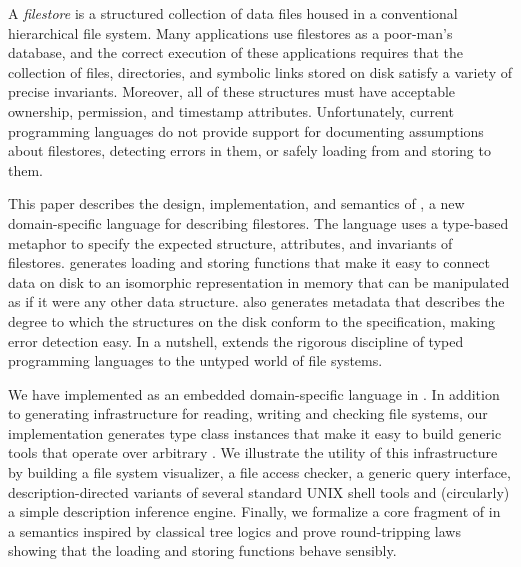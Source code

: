 A {\em filestore} is a structured collection of data files housed in a
conventional hierarchical file system. Many applications use filestores
as a poor-man's database, and the correct execution of these
applications requires that the collection of files, directories, and
symbolic links stored on disk satisfy a variety of precise
invariants. Moreover, all of these structures must have acceptable
ownership, permission, and timestamp attributes. Unfortunately,
current programming languages do not provide support for documenting
assumptions about filestores, detecting errors in them, or safely loading from
and storing to them.

This paper describes the design, implementation, and semantics of
\forest{}, a new domain-specific language for describing
filestores. The language uses a type-based metaphor to specify the
expected structure, attributes, and invariants of filestores.
\forest{} generates loading and storing functions that make it easy to
connect data on disk to an isomorphic representation in memory that
can be manipulated as if it were any other data structure.  \forest{}
also generates metadata that describes the degree to which the
structures on the disk conform to the specification, making error
detection easy. In a nutshell, \forest{} extends the
rigorous discipline of typed programming languages to the untyped 
world of file systems.

We have implemented \forest{} as an embedded domain-specific language
in \haskell{}. In addition to generating infrastructure for reading,
writing and checking file systems, our implementation generates 
type class instances that make it easy to build generic tools that
operate over arbitrary \filestores.  We illustrate the utility of
this infrastructure by building a file system visualizer, a file access
checker, a generic query interface, description-directed variants of 
several standard UNIX shell tools and (circularly) a simple \forest{}
description inference engine.   Finally, we formalize a core fragment 
of \forest{} in a
semantics inspired by classical tree logics and prove round-tripping
laws showing that the loading and storing functions behave sensibly.
